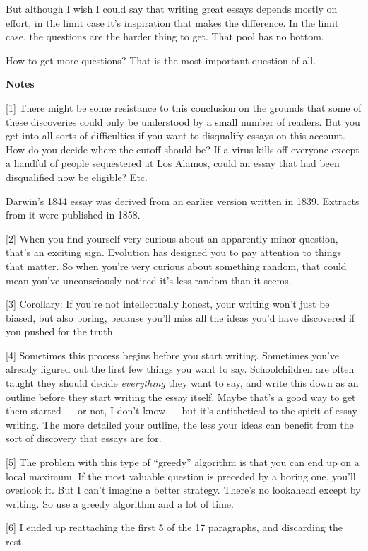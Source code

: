 But although I wish I could say that writing great essays depends mostly
on effort, in the limit case it's inspiration that makes the difference.
In the limit case, the questions are the harder thing to get. That pool
has no bottom.

How to get more questions? That is the most important question of all.

\textbf{Notes}

{[}1{]} There might be some resistance to this conclusion on the grounds
that some of these discoveries could only be understood by a small
number of readers. But you get into all sorts of difficulties if you
want to disqualify essays on this account. How do you decide where the
cutoff should be? If a virus kills off everyone except a handful of
people sequestered at Los Alamos, could an essay that had been
disqualified now be eligible? Etc.

Darwin's 1844 essay was derived from an earlier version written in 1839.
Extracts from it were published in 1858.

{[}2{]} When you find yourself very curious about an apparently minor
question, that's an exciting sign. Evolution has designed you to pay
attention to things that matter. So when you're very curious about
something random, that could mean you've unconsciously noticed it's less
random than it seems.

{[}3{]} Corollary: If you're not intellectually honest, your writing
won't just be biased, but also boring, because you'll miss all the ideas
you'd have discovered if you pushed for the truth.

{[}4{]} Sometimes this process begins before you start writing.
Sometimes you've already figured out the first few things you want to
say. Schoolchildren are often taught they should decide
\emph{everything} they want to say, and write this down as an outline
before they start writing the essay itself. Maybe that's a good way to
get them started --- or not, I don't know --- but it's antithetical to
the spirit of essay writing. The more detailed your outline, the less
your ideas can benefit from the sort of discovery that essays are for.

{[}5{]} The problem with this type of ``greedy'' algorithm is that you
can end up on a local maximum. If the most valuable question is preceded
by a boring one, you'll overlook it. But I can't imagine a better
strategy. There's no lookahead except by writing. So use a greedy
algorithm and a lot of time.

{[}6{]} I ended up reattaching the first 5 of the 17 paragraphs, and
discarding the rest.


